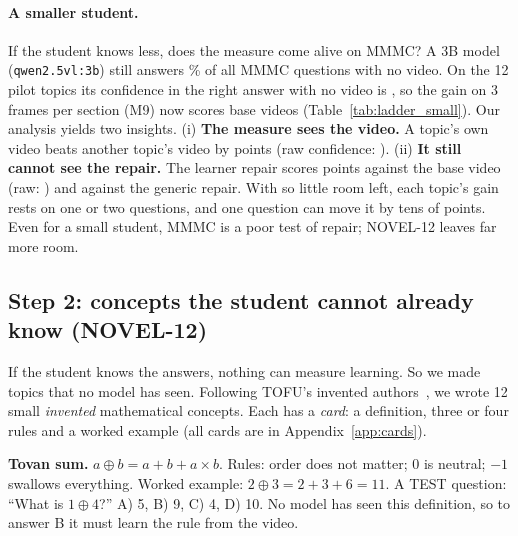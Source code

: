 \documentclass[11pt]{article}
\begin{document}
\DiagLadder


\paragraph{A smaller student.} If the student knows less, does the measure come alive on MMMC? A 3B model
(\texttt{qwen2.5vl:3b}) still answers \mmmcpriorQwenSmallAcc\% of all MMMC questions with no video. On the 12 pilot
topics its confidence in the right answer with no video is \LadSmallSBlind{}, so the gain on 3 frames per section (M9)
now scores \LadSmallDefinedNine{} base videos (Table~\ref{tab:ladder_small}). Our analysis yields two insights.
(i) \textbf{The measure sees the video.} A topic's own video beats another topic's video by \LadSmallSepNine{} points
(raw confidence: \LadSmallSepRawNine{}).
(ii) \textbf{It still cannot see the repair.} The learner repair scores \LadSmallLBNine{} points against the base video
(raw: \LadSmallLBRawNine{}) and \LadSmallLGNine{} against the generic repair. With so little room left, each topic's
gain rests on one or two questions, and one question can move it by tens of points. Even for a small student, MMMC
is a poor test of repair; NOVEL-12 leaves far more room.



\subsection{Step 2: concepts the student cannot already know (NOVEL-12)}

If the student knows the answers, nothing can measure learning. So we made topics that no model has seen. Following
TOFU's invented authors~\cite{tofu}, we wrote 12 small \emph{invented} mathematical concepts. Each has a \emph{card}:
a definition, three or four rules and a worked example (all cards are in Appendix~\ref{app:cards}).

\begin{example}
\textbf{Tovan sum.} $a \oplus b = a + b + a \times b$. Rules: order does not matter; 0 is neutral; $-1$ swallows
everything. Worked example: $2 \oplus 3 = 2 + 3 + 6 = 11$.
A TEST question: ``What is $1 \oplus 4$?'' A) 5, B) 9, C) 4, D) 10. No model has seen this definition, so to answer B
it must learn the rule from the video.
\end{example}
\end{document}
